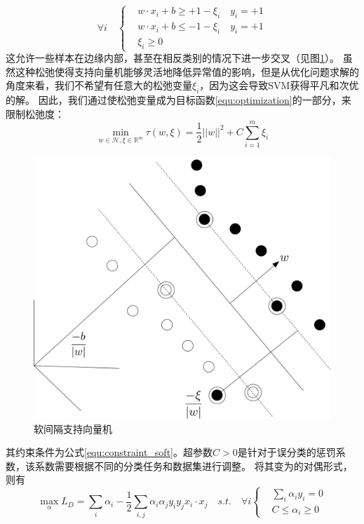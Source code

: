 \begin{equation}
	\forall i \quad
	\left\{
	 \begin{aligned}
	&w\cdot x_i + b \geq +1-\xi_i \quad y_i=+1  \\
	&w\cdot x_i + b \leq -1-\xi_i \quad y_i=+1  \\
	&\xi_i \geq 0
	\end{aligned}
	 \right.
	\label{equ:constraint_soft}
\end{equation}
这允许一些样本在边缘内部，甚至在相反类别的情况下进一步交叉（见图\ref{fig:softmargin}）。 虽然这种松弛使得支持向量机能够灵活地降低异常值的影响，但是从优化问题求解的角度来看，我们不希望有任意大的松弛变量$\xi_i$，因为这会导致SVM获得平凡和次优的解。 因此，我们通过使松弛变量成为目标函数\ref{equ:optimization}的一部分，来限制松弛度：
\begin{equation}
	\min \limits_{w\in \mathcal{H},\xi\in \mathbb{R}^m} \tau(w,\xi)=\frac{1}{2}||w||^2+C\sum_{i=1}^m {\xi_i}
\end{equation}
\begin{figure}[H]
	\centering
	\includegraphics[width=\textwidth]{figures/emitter/svm_soft}
	\caption{软间隔支持向量机}
	\label{fig:softmargin}
\end{figure}
其约束条件为公式\ref{equ:constraint_soft}。超参数$C>0$是针对于误分类的惩罚系数，该系数需要根据不同的分类任务和数据集进行调整。
将其变为的对偶形式，则有
\begin{equation}
	\max \limits_{\alpha} L_D=\sum_i{\alpha_i}-\frac{1}{2}\sum_{i,j}\alpha_i\alpha_jy_iy_jx_i\cdot x_j \quad s.t. \quad \forall i 
	\left\{
		\begin{aligned}
	   &\sum_i{\alpha_iy_i}=0  \\
	   &C \leq \alpha_i \geq 0
	   \end{aligned}
		\right.
	\label{equ:cdotdual}
\end{equation}

